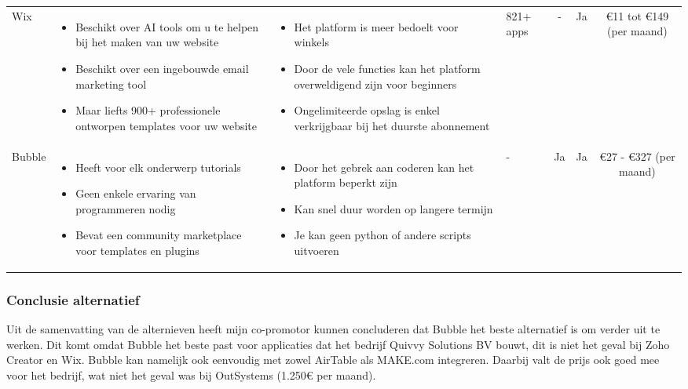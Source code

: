 \begin{longtable}{p{2.2cm} p{2.4cm} p{2.4cm} p{2.2cm} c c c}
    Wix & 
    \begin{itemize}

        \item Beschikt over AI tools om u te helpen bij het maken van uw website
        \item Beschikt over een ingebouwde email marketing tool
        \item Maar liefts 900+ professionele ontworpen templates voor uw website
    \end{itemize} & 
    \begin{itemize}
        \item Het platform is meer bedoelt voor winkels
        \item Door de vele functies kan het platform overweldigend zijn voor beginners
        \item Ongelimiteerde opslag is enkel verkrijgbaar bij het duurste abonnement
    \end{itemize} &
    821+ apps &
    - &
    Ja &
    €11 tot €149 (per maand)\\

    Bubble & 
    \begin{itemize}
        \item Heeft voor elk onderwerp tutorials
        \item Geen enkele ervaring van programmeren nodig
        \item Bevat een community marketplace voor templates en plugins
    \end{itemize} & 
    \begin{itemize}
        \item Door het gebrek aan coderen kan het platform beperkt zijn
        \item Kan snel duur worden op langere termijn
        \item Je kan geen python of andere scripts uitvoeren
    \end{itemize} &
    - &
    Ja &
    Ja &
    €27 - €327 (per maand)\\
\end{longtable}

\subsubsection*{Conclusie alternatief}
Uit de samenvatting van de alternieven heeft mijn co-promotor kunnen concluderen dat Bubble het beste alternatief is om verder uit te werken.
Dit komt omdat Bubble het beste past voor applicaties dat het bedrijf Quivvy Solutions BV bouwt, dit is niet het geval bij Zoho Creator en Wix. 
Bubble kan namelijk ook eenvoudig met zowel AirTable als MAKE.com integreren. Daarbij valt de prijs ook goed mee voor het bedrijf, wat niet het geval was bij OutSystems (1.250€ per maand).


